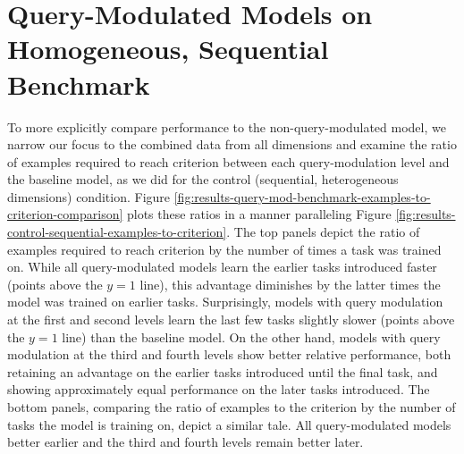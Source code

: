 \FloatBarrier
\section{Query-Modulated Models on Homogeneous, Sequential Benchmark\label{res:query-mod-sequential}}
To more explicitly compare performance to the non-query-modulated model, we narrow our focus to the combined data from all dimensions and examine the ratio of examples required to reach criterion between each query-modulation level and the baseline model, as we did for the control (sequential, heterogeneous dimensions) condition. Figure \ref{fig:results-query-mod-benchmark-examples-to-criterion-comparison} plots these ratios in a manner paralleling Figure \ref{fig:results-control-sequential-examples-to-criterion}. The top panels depict the ratio of examples required to reach criterion by the number of times a task was trained on. While all query-modulated models learn the earlier tasks introduced faster (points above the $y=1$ line), this advantage diminishes by the latter times the model was trained on earlier tasks. Surprisingly, models with query modulation at the first and second levels learn the last few tasks slightly slower (points above the $y=1$ line) than the baseline model. On the other hand, models with query modulation at the third and fourth levels show better relative performance, both retaining an advantage on the earlier tasks introduced until the final task, and showing approximately equal performance on the later tasks introduced. The bottom panels, comparing the ratio of examples to the criterion by the number of tasks the model is training on, depict a similar tale. All query-modulated models better earlier and the third and fourth levels remain better later. 

